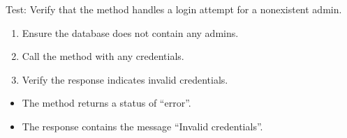 \documentclass[letterpaper,10pt,english]{sphinxmanual}
\begin{document}
\begin{fulllineitems}
\label{\detokenize{test:test.test_admin.test_login_admin_nonexistent_user}}
\pysigstartsignatures
\pysiglinewithargsret
{}
{}
{}
\pysigstopsignatures
\sphinxAtStartPar
Test: Verify that the method handles a login attempt for a non\sphinxhyphen{}existent admin.
\begin{description}
\begin{enumerate}
%
\item {} 
\sphinxAtStartPar
Ensure the database does not contain any admins.

\item {} 
\sphinxAtStartPar
Call the  method with any credentials.

\item {} 
\sphinxAtStartPar
Verify the response indicates invalid credentials.

\end{enumerate}

\begin{itemize}
\item {} 
\sphinxAtStartPar
The method returns a status of “error”.

\item {} 
\sphinxAtStartPar
The response contains the message “Invalid credentials”.

\end{itemize}

\end{description}

\end{fulllineitems}

\end{document}
